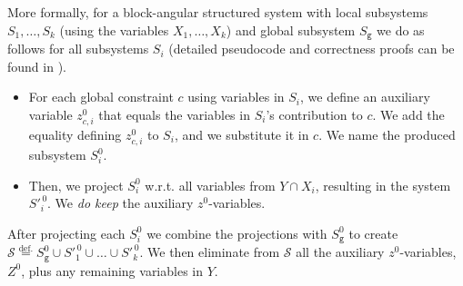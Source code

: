 \documentclass{llncs}
\newcommand{\trt}[1]{\texttt{#1}}
\begin{document}
More formally, for a block-angular structured system with local subsystems $S_1,\ldots, S_k$ (using the variables $X_1,\ldots, X_k$) and global subsystem $S_\texttt{g}$
we do as follows for all subsystems $S_i$ (detailed pseudocode and correctness proofs can be found in \cite{mytechrep}). 
\begin{itemize}[noitemsep,topsep=0pt]
\item For each global constraint $c$ using variables in $S_i$, we define an auxiliary variable $z^0_{c,i}$ that equals the variables in $S_i$'s contribution to $c$. We add the equality defining $z^0_{c,i}$ to $S_i$, and we substitute it in $c$. 
We name the produced subsystem $S_i^0$. 
\item Then, we project $S_i^0$ w.r.t. all variables from $Y\cap X_i$, resulting in the system $S'^{\,0}_i$. We \emph{do keep} the auxiliary $z^0$-variables. 
\end{itemize}
After projecting each $S_i^0$ we combine the projections with $S_\trt{g}^0$ to create $\mathcal{S} \overset{\text{def.}}{=}S^0_\trt{g} \cup S'^{\,0}_1\cup \ldots \cup S'^{\,0}_k$.
We then eliminate from $\mathcal{S}$ all the auxiliary $z^0$-variables, $Z^0$, plus any remaining variables in $Y$. 
\end{document}
